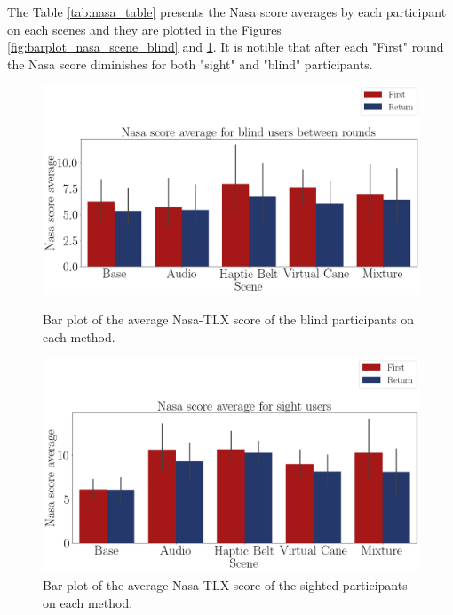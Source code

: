 The Table \ref{tab:nasa_table} presents the Nasa score averages by each participant on each scenes and they are plotted in the Figures \ref{fig:barplot_nasa_scene_blind} and \ref{fig:barplot_nasa_scene_sight}. It is notible that after each "First" round the Nasa score diminishes for both "sight" and "blind" participants.



\begin{figure}[!htb]
    \centering
    \begin{minipage}{\textwidth}
        \centering
        \includegraphics[width = 0.8\linewidth]{Resultados/Nasa/Figuras/png/barplot_nasa_avg_scene_blind.png}
        \caption{Bar plot of the average Nasa-TLX score of the blind participants on each method.}
        \label{fig:barplot_nasa_scene_blind}
    \end{minipage}
    \begin{minipage}{\textwidth}
        \centering
        \includegraphics[width = 0.8\linewidth]{Resultados/Nasa/Figuras/png/barplot_nasa_avg_scene_sight.png}
        \caption{Bar plot of the average Nasa-TLX score of the sighted participants on each method.}
        \label{fig:barplot_nasa_scene_sight}
    \end{minipage}
\end{figure}


